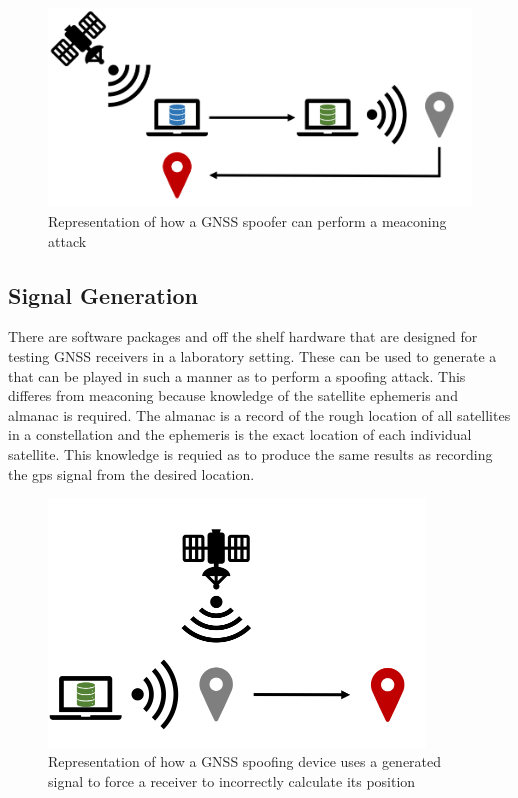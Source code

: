 \begin{figure}[h]
    \begin{centering}
        \includegraphics[width=12cm, keepaspectratio]{Figures/Meaconing.png}
        \caption{Representation of how a GNSS spoofer can perform a meaconing attack}
    \label{fig:meaconing cartoon}
    \end{centering}
\end{figure}

\subsection{Signal Generation}
There are software packages and off the shelf hardware that are designed for testing GNSS receivers in a laboratory setting. These can be used to generate a that can be
played in such a manner as to perform a spoofing attack. This differes from meaconing because knowledge of the satellite ephemeris and almanac is required. The almanac is
a record of the rough location of all satellites in a constellation and the ephemeris is the exact location of each individual satellite. This knowledge is requied as to
produce the same results as recording the gps signal from the desired location.

\begin{figure}[h]
    \begin{centering}
        \includegraphics[width=10cm, keepaspectratio]{Figures/Spoofing.png}
        \caption{Representation of how a GNSS spoofing device uses a generated signal to force a receiver to incorrectly calculate its position}
    \label{fig:spoofing cartoon}
    \end{centering}
\end{figure}

